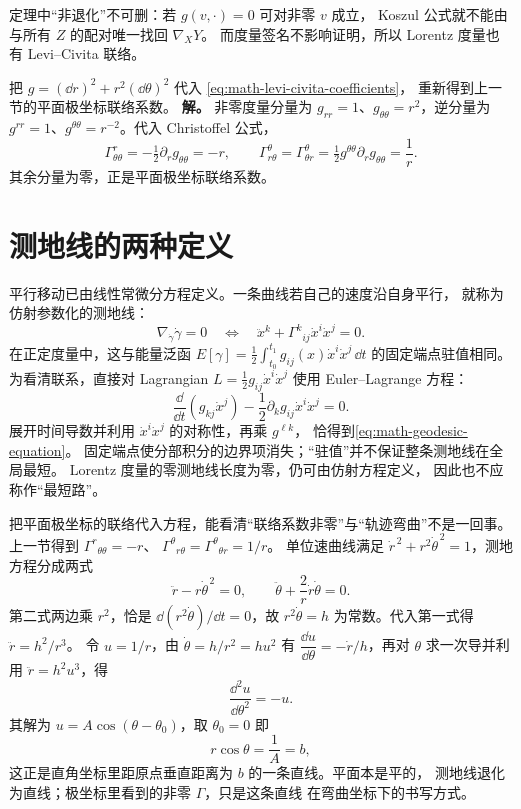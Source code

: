 定理中“非退化”不可删：若 \(g(v,\cdot)=0\) 可对非零 \(v\) 成立，
Koszul 公式就不能由与所有 \(Z\) 的配对唯一找回 \(\nabla_XY\)。
而度量签名不影响证明，所以 Lorentz 度量也有 Levi--Civita 联络。


\begin{workedexample}
把 \(g=(\dd r)^2+r^2(\dd\theta)^2\) 代入
\cref{eq:math-levi-civita-coefficients}，
重新得到上一节的平面极坐标联络系数。
\textbf{解。} 非零度量分量为 \(g_{rr}=1\)、\(g_{\theta\theta}=r^2\)，逆分量为 \(g^{rr}=1\)、\(g^{\theta\theta}=r^{-2}\)。代入 Christoffel 公式，
\[
\Gamma^r_{\theta\theta}=-\tfrac12\partial_rg_{\theta\theta}=-r,\qquad
\Gamma^\theta_{r\theta}=\Gamma^\theta_{\theta r}
=\tfrac12g^{\theta\theta}\partial_rg_{\theta\theta}=\frac1r.
\]
其余分量为零，正是平面极坐标联络系数。
\end{workedexample}

\section{测地线的两种定义}
\label{sec:math-geodesic-variation}

平行移动已由线性常微分方程定义。一条曲线若自己的速度沿自身平行，
就称为仿射参数化的测地线：
\begin{equation}
\nabla_{\dot\gamma}\dot\gamma=0
\quad\Longleftrightarrow\quad
\ddot x^k+\Gamma^k{}_{ij}\dot x^i\dot x^j=0.
\label{eq:math-geodesic-equation}
\end{equation}
在正定度量中，这与能量泛函
\(E[\gamma]=\frac12\int_{t_0}^{t_1}
g_{ij}(x)\dot x^i\dot x^j\,\dd t\) 的固定端点驻值相同。
为看清联系，直接对 Lagrangian
\(L=\frac12g_{ij}\dot x^i\dot x^j\) 使用 Euler--Lagrange 方程：
\[
\frac{\dd}{\dd t}(g_{kj}\dot x^j)
-\frac12\partial_k g_{ij}\dot x^i\dot x^j=0.
\]
展开时间导数并利用 \(\dot x^i\dot x^j\) 的对称性，再乘 \(g^{\ell k}\)，
恰得到\cref{eq:math-geodesic-equation}。
固定端点使分部积分的边界项消失；“驻值”并不保证整条测地线在全局最短。
Lorentz 度量的零测地线长度为零，仍可由仿射方程定义，
因此也不应称作“最短路”。

把平面极坐标的联络代入方程，能看清“联络系数非零”与“轨迹弯曲”不是一回事。
上一节得到 \(\Gamma^r{}_{\theta\theta}=-r\)、
\(\Gamma^\theta{}_{r\theta}=\Gamma^\theta{}_{\theta r}=1/r\)。
单位速曲线满足 \(\dot r^{\,2}+r^2\dot\theta^{\,2}=1\)，测地方程分成两式
\[
\ddot r-r\dot\theta^{\,2}=0,
\qquad
\ddot\theta+\frac{2}{r}\dot r\dot\theta=0.
\]
第二式两边乘 \(r^2\)，恰是 \(\dd(r^2\dot\theta)/\dd t=0\)，故
\(r^2\dot\theta=h\) 为常数。代入第一式得 \(\ddot r=h^2/r^3\)。
令 \(u=1/r\)，由 \(\dot\theta=h/r^2=hu^2\) 有
\(\dfrac{\dd u}{\dd\theta}=-\dot r/h\)，再对 \(\theta\) 求一次导并利用
\(\ddot r=h^2u^3\)，得
\[
\frac{\dd^2 u}{\dd\theta^2}=-u.
\]
其解为 \(u=A\cos(\theta-\theta_0)\)，取 \(\theta_0=0\) 即
\[
r\cos\theta=\frac1A=b,
\]
这正是直角坐标里距原点垂直距离为 \(b\) 的一条直线。平面本是平的，
测地线退化为直线；极坐标里看到的非零 \(\Gamma\)，只是这条直线
在弯曲坐标下的书写方式。

